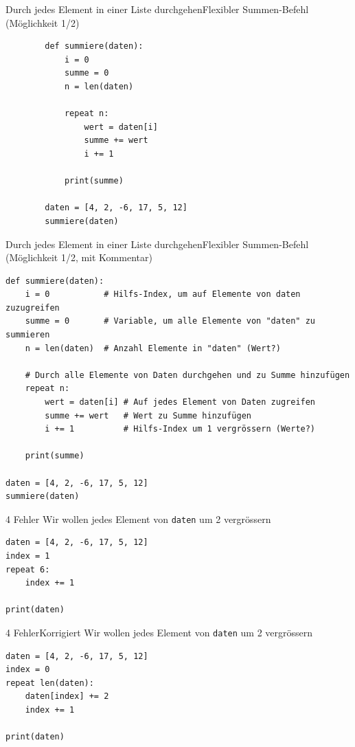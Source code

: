 \begin{frame}[fragile]{Durch jedes Element in einer Liste durchgehen}{Flexibler Summen-Befehl (Möglichkeit 1/2)}
	\begin{lstlisting}
		def summiere(daten):
			i = 0
			summe = 0
			n = len(daten)
			
			repeat n:
				wert = daten[i]
				summe += wert
				i += 1
			
			print(summe)
			
		daten = [4, 2, -6, 17, 5, 12] 
		summiere(daten)
	\end{lstlisting}
\end{frame}


\begin{frame}[fragile]{Durch jedes Element in einer Liste durchgehen}{Flexibler Summen-Befehl (Möglichkeit 1/2, mit Kommentar)}
\begin{lstlisting}
def summiere(daten):
	i = 0           # Hilfs-Index, um auf Elemente von daten zuzugreifen
	summe = 0       # Variable, um alle Elemente von "daten" zu summieren
	n = len(daten)  # Anzahl Elemente in "daten" (Wert?)
	
	# Durch alle Elemente von Daten durchgehen und zu Summe hinzufügen
	repeat n:
		wert = daten[i] # Auf jedes Element von Daten zugreifen 
		summe += wert   # Wert zu Summe hinzufügen
		i += 1          # Hilfs-Index um 1 vergrössern (Werte?)
		
	print(summe)
	
daten = [4, 2, -6, 17, 5, 12] 
summiere(daten)
\end{lstlisting}
\end{frame}

\begin{frame}[fragile]{4 Fehler}
Wir wollen jedes Element von \lstinline|daten| um 2 vergrössern
\begin{lstlisting}
daten = [4, 2, -6, 17, 5, 12] 
index = 1
repeat 6:
	index += 1
	
print(daten)
\end{lstlisting}
\end{frame}

\begin{frame}[fragile]{4 Fehler}{Korrigiert}
Wir wollen jedes Element von \lstinline|daten| um 2 vergrössern
\begin{lstlisting}
daten = [4, 2, -6, 17, 5, 12] 
index = 0
repeat len(daten):
	daten[index] += 2
	index += 1
	
print(daten)
\end{lstlisting}
\end{frame}

